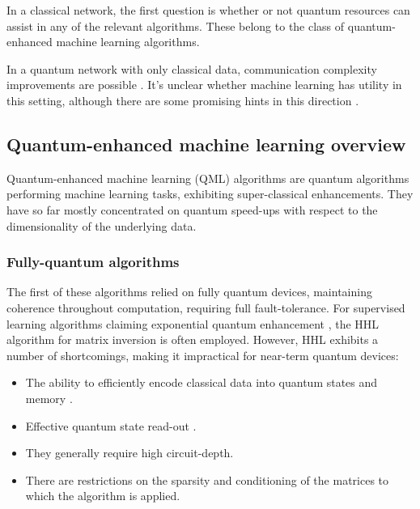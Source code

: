 \documentclass[twocolumn, aps, rmp, amsmath, amssymb, nofootinbib, superscriptaddress, longbibliography, floatfix, table-of-contents, eqsecnum]{revtex4}
\begin{document}
In a classical network, the first question is whether or not quantum resources can assist in any of the relevant algorithms. These belong to the class of quantum-enhanced machine learning algorithms.

In a quantum network with only classical data, communication complexity improvements are possible \cite{bib:brassard2003quantum}. It's unclear whether machine learning has utility in this setting, although there are some promising hints in this direction \cite{bib:kane2017communication, bib:balcan2012distributed, bib:conitzer2004communication}.

\subsection{Quantum-enhanced machine learning overview}

Quantum-enhanced machine learning (QML) algorithms are quantum algorithms performing machine learning tasks, exhibiting super-classical enhancements. They have so far mostly concentrated on quantum speed-ups with respect to the dimensionality of the underlying data.

\subsubsection{Fully-quantum algorithms}

The first of these algorithms relied on fully quantum devices, maintaining coherence throughout computation, requiring full fault-tolerance. For supervised learning algorithms claiming exponential quantum enhancement \cite{bib:biamonte2017quantum, bib:ciliberto2018quantum}, the HHL algorithm \cite{bib:harrow2009quantum} for matrix inversion is often employed. However, HHL exhibits a number of shortcomings, making it impractical for near-term quantum devices:
\begin{itemize}
\item The ability to efficiently encode classical data into quantum states and memory \cite{bib:aaronson2015read}.
\item Effective quantum state read-out \cite{bib:aaronson2015read}.
\item They generally require high circuit-depth.
\item There are restrictions on the sparsity and conditioning of the matrices to which the algorithm is applied.
\end{itemize}
\end{document}
